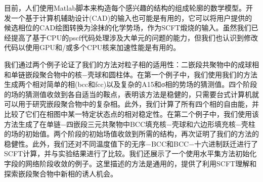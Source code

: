 \documentclass[12pt，a4paper]{article}
\numberwithin{equation}{section}
\begin{document}
目前，人们使用Matlab脚本来构造每个感兴趣的结构的组成轮廓的数学模型。开发一个基于计算机辅助设计(CAD)的输入也可能是有用的，它可以将用户提供的候选相位的CAD绘图转换为涂抹的化学势场，作为SCFT煅烧的输入。虽然我们已经提高了基于CPU的pscf代码处理涉及大单元的问题的能力，但我们也认识到修改代码以使用GPU和/或多个CPU核来加速性能是有用的。

我们通过两个例子论证了我们的方法对粒子相的适用性：二嵌段共聚物中的成球相和单链嵌段聚合物中的核−壳球和圆柱体。在第一个例子中，我们使用我们的方法生成两个相对简单的相(bcc和fcc)以及复杂的A15和σ相的势场的猜测值。四个阶段的场的猜测值收敛到各自适当的鞍点，表明该方法是稳健的，只需要台式计算机就可以用于研究嵌段聚合物中的复杂相。此外，我们计算了所有四个相的自由能，并比较了它们在相图中某一特定状态点的相对稳定性。在第二个例子中，我们使用该方法生成了在单链−四嵌段三元共聚物中BCC填充核−壳球和六边形填充核−壳柱的场的初始值。两个阶段的初始场值收敛到所需的结构，再次证明了我们的方法的稳健性。此外，我们还对不同温度值下的无序−BCC和BCC−十六进制跃迁进行了SCFT计算，并与实验结果进行了比较。我们还展示了一个使用水平集方法初始化字段的网络阶段收敛的例子。这里描述的方法是通用的，提供了利用SCFT理解和探索嵌段聚合物中新相的诱人机会。


\cite{tam19912d}

%
\end{document}
